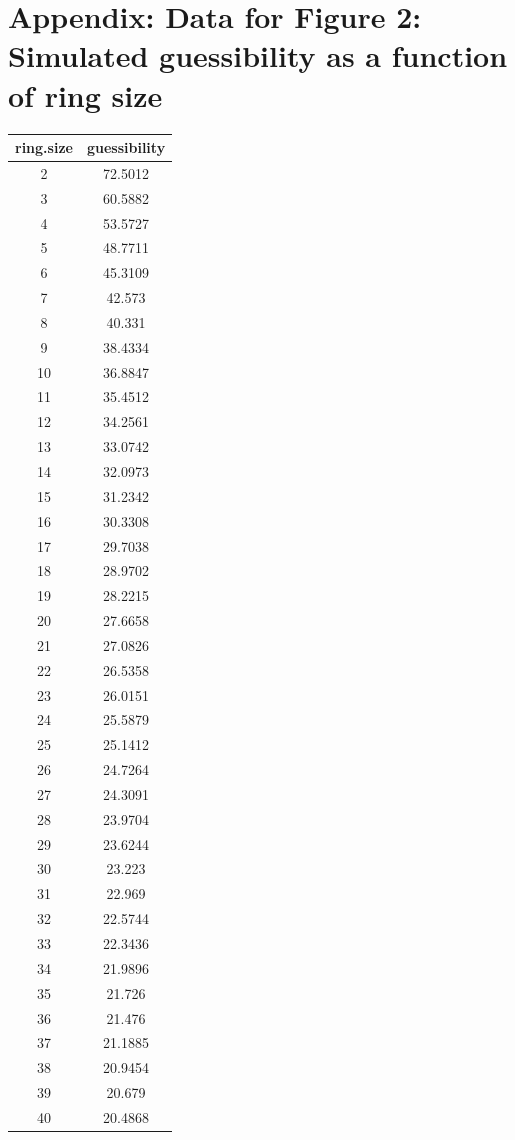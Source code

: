 \documentclass[english]{paper}
\providecommand{\tabularnewline}{\\}
\begin{document}
\section{Appendix: Data for Figure 2: Simulated guessibility as a function
of ring size}

\begin{tabular}{|c|c|}
\hline 
ring.size & guessibility\tabularnewline
\hline 
\hline 
2 & 72.5012\tabularnewline
\hline 
3 & 60.5882\tabularnewline
\hline 
4 & 53.5727\tabularnewline
\hline 
5 & 48.7711\tabularnewline
\hline 
6 & 45.3109\tabularnewline
\hline 
7 & 42.573\tabularnewline
\hline 
8 & 40.331\tabularnewline
\hline 
9 & 38.4334\tabularnewline
\hline 
10 & 36.8847\tabularnewline
\hline 
11 & 35.4512\tabularnewline
\hline 
12 & 34.2561\tabularnewline
\hline 
13 & 33.0742\tabularnewline
\hline 
14 & 32.0973\tabularnewline
\hline 
15 & 31.2342\tabularnewline
\hline 
16 & 30.3308\tabularnewline
\hline 
17 & 29.7038\tabularnewline
\hline 
18 & 28.9702\tabularnewline
\hline 
19 & 28.2215\tabularnewline
\hline 
20 & 27.6658\tabularnewline
\hline 
21 & 27.0826\tabularnewline
\hline 
22 & 26.5358\tabularnewline
\hline 
23 & 26.0151\tabularnewline
\hline 
24 & 25.5879\tabularnewline
\hline 
25 & 25.1412\tabularnewline
\hline 
26 & 24.7264\tabularnewline
\hline 
27 & 24.3091\tabularnewline
\hline 
28 & 23.9704\tabularnewline
\hline 
29 & 23.6244\tabularnewline
\hline 
30 & 23.223\tabularnewline
\hline 
31 & 22.969\tabularnewline
\hline 
32 & 22.5744\tabularnewline
\hline 
33 & 22.3436\tabularnewline
\hline 
34 & 21.9896\tabularnewline
\hline 
35 & 21.726\tabularnewline
\hline 
36 & 21.476\tabularnewline
\hline 
37 & 21.1885\tabularnewline
\hline 
38 & 20.9454\tabularnewline
\hline 
39 & 20.679\tabularnewline
\hline 
40 & 20.4868\tabularnewline
\hline 
\end{tabular}$\;$%
\end{document}

